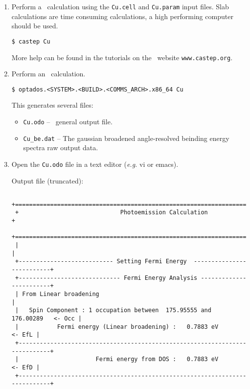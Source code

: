 \documentclass[a4paper,11pt,twoside]{book}
\begin{document}
\begin{enumerate}
\item Perform a \castep\ calculation using the  \verb#Cu.cell#  and \verb#Cu.param# input files. Slab calculations are time consuming calculations, a high performing computer should be used.

  \verb#$ castep Cu# 

More help can be found in  the tutorials  on  the \castep\ website \verb#www.castep.org#.  

\item Perform an \optados\ calculation.
 
\verb#$ optados.<SYSTEM>.<BUILD>.<COMMS_ARCH>.x86_64 Cu# 

This generates several files:
\begin{itemize}
\item \verb#Cu.odo# -- \optados\ general output file.
\item \verb#Cu_be.dat# -- The gaussian broadened angle-resolved beinding energy spectra raw output data.
\end{itemize}

\item Open the \verb#Cu.odo# file in a text editor (\emph{e.g.} vi or emacs).


 
 Output file (truncated):
 \begin{verbatim}
  +============================================================================+
 +                             Photoemission Calculation                      +
 +============================================================================+
 |                                                                            |
 +--------------------------- Setting Fermi Energy  --------------------------+
 +----------------------------- Fermi Energy Analysis ------------------------+
 | From Linear broadening                                                     |
 |   Spin Component : 1 occupation between  175.95555 and  176.00289   <- Occ |
 |           Fermi energy (Linear broadening) :   0.7883 eV            <- EfL |
 +----------------------------------------------------------------------------+
 |                      Fermi energy from DOS :   0.7883 eV            <- EfD |
 +----------------------------------------------------------------------------+


\end{verbatim}
\end{enumerate}
\end{document}
